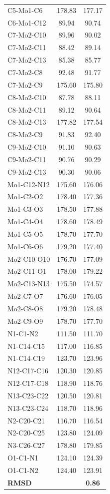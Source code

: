 \begin{table}[]
\begin{tabular}{lcc}
C5-Mo1-C6 & 178.83 & 177.17 \\
C6-Mo1-C12 & 89.94 & 90.74 \\
C7-Mo2-C10 & 89.96 & 90.02 \\
C7-Mo2-C11 & 88.42 & 89.14 \\
C7-Mo2-C13 & 85.38 & 85.77 \\
C7-Mo2-C8 & 92.48 & 91.77 \\
C7-Mo2-C9 & 175.60 & 175.80 \\
C8-Mo2-C10 & 87.78 & 88.11 \\
C8-Mo2-C11 & 89.12 & 90.64 \\
C8-Mo2-C13 & 177.82 & 177.54 \\
C8-Mo2-C9 & 91.83 & 92.40 \\
C9-Mo2-C10 & 91.10 & 90.63 \\
C9-Mo2-C11 & 90.76 & 90.29 \\
C9-Mo2-C13 & 90.30 & 90.06 \\
Mo1-C12-N12 & 175.60 & 176.06 \\
Mo1-C2-O2 & 178.40 & 177.36 \\
Mo1-C3-O3 & 178.50 & 177.88 \\
Mo1-C4-O4 & 178.60 & 178.49 \\
Mo1-C5-O5 & 178.70 & 177.70 \\
Mo1-C6-O6 & 179.20 & 177.40 \\
Mo2-C10-O10 & 176.70 & 177.09 \\
Mo2-C11-O1 & 178.00 & 179.22 \\
Mo2-C13-N13 & 175.50 & 174.57 \\
Mo2-C7-O7 & 176.60 & 176.05 \\
Mo2-C8-O8 & 179.20 & 178.48 \\
Mo2-C9-O9 & 178.70 & 177.70 \\
N1-C1-N2 & 111.50 & 111.70 \\
N1-C14-C15 & 117.00 & 116.85 \\
N1-C14-C19 & 123.70 & 123.96 \\
N12-C17-C16 & 120.30 & 120.85 \\
N12-C17-C18 & 118.90 & 118.76 \\
N13-C23-C22 & 120.50 & 120.81 \\
N13-C23-C24 & 118.70 & 118.96 \\
N2-C20-C21 & 116.70 & 116.54 \\
N2-C20-C25 & 123.80 & 124.09 \\
N3-C26-C27 & 178.80 & 179.85 \\
O1-C1-N1 & 124.10 & 124.39 \\
O1-C1-N2 & 124.40 & 123.91 \\ \hline
\textbf{RMSD} & \textbf{} & \textbf{0.86}
\end{tabular}
\end{table}


